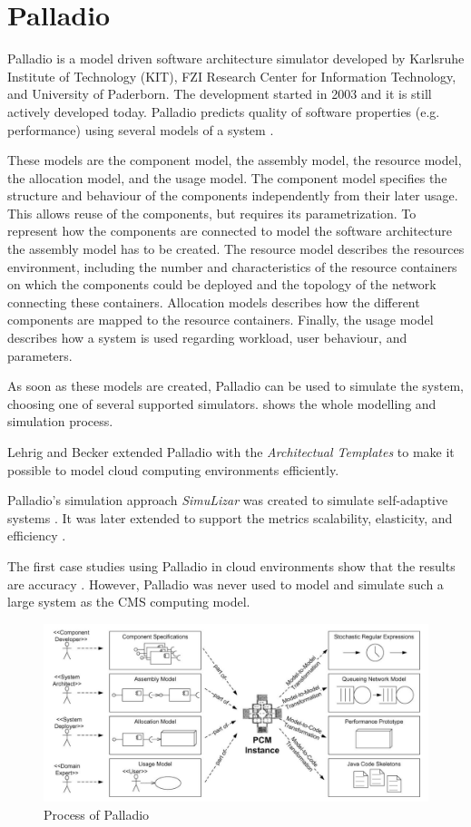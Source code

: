 \section{Palladio}
\label{palladio}
Palladio is a model driven software architecture simulator developed by Karlsruhe Institute of Technology (KIT), FZI Research Center for Information Technology, and University of Paderborn. The development started in 2003 and it is still actively developed today. Palladio predicts quality of software properties (e.g. performance) using several models of a system \cite{BECKER20093}.

These models are the component model, the assembly model, the resource model, the allocation model, and the usage model.
The component model specifies the structure and behaviour of the components independently from their later usage. This allows reuse of the components,  but requires its parametrization.
To represent how the components are connected to model the software architecture the assembly model has to be created. 
The resource model describes the resources environment, including the number and characteristics of the resource containers on which the components could be deployed and the topology of the network connecting these containers.
Allocation models describes how the different components are mapped to the resource containers.
Finally, the usage model describes how a system is used regarding workload, user behaviour, and parameters.

As soon as these models are created, Palladio can be used to simulate the system, choosing one of several supported simulators.  shows the whole modelling and simulation process. 

Lehrig and Becker \cite{arch} extended Palladio with the \textit{Architectual Templates} to make it possible to model cloud computing environments efficiently.

Palladio's simulation approach \textit{SimuLizar} was created to simulate self-adaptive systems \cite{becker2013simulizar}.
It was later extended to support the metrics scalability, elasticity, and efficiency \cite{arch}.

The first case studies using Palladio in cloud environments show that the results are accuracy \cite{arch}. However, Palladio was never used to model and simulate such a large system as the CMS computing model.

\begin{figure}
	\centering
	\includegraphics[width=0.95\linewidth]{images/palladio}
	\caption[]{Process of Palladio \cite{BECKER20093}}
	\label{fig:palladio}
\end{figure}



